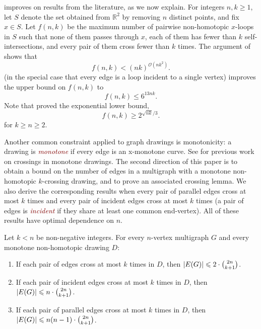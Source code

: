 \documentclass[a4paper,11pt]{article}
\renewcommand{\geq}{\geqslant}
\renewcommand{\leq}{\leqslant}
\DeclarePairedDelimiter{\abs}{\lvert}{\rvert} %
\newcommand{\defn}[1]{\textcolor{Maroon}{\emph{#1}}}
\newcommand{\OO}{\mathcal{O}}
\begin{document}
 improves on results from the literature, as we now explain. 
For integers $n, k \geq 1$, let $S$ denote the set obtained from $\mathbb{R}^2$ by removing $n$
distinct points, and fix $x\in S$. Let $f(n, k)$ be the maximum number of pairwise non-homotopic $x$-loops in $S$ such that none of them passes through $x$, each of them has fewer than $k$ self-intersections, and every pair of them cross fewer than $k$ times. 
The argument of \citet*{JMM96} shows that
\begin{equation}\label{eq:fUpperBound} 
   f(n, k) < (nk)^{\OO(nk^2)}.
\end{equation}
 (in the special case that every edge is a loop incident to a single vertex) improves the upper bound on $f(n, k)$ to
\begin{equation*}
    f(n, k) \leq 6^{13 n k}. 
\end{equation*}
Note that \citet*{PTT22} proved the exponential lower bound, 
\begin{equation}\label{eq:PTTLB}
    f(n, k) \geq 2^{\sqrt{nk}/3}.
\end{equation}
for $k \geq n \geq 2$.

Another common constraint applied to graph drawings is monotonicity: a drawing is \defn{monotone} if every edge is an x-monotone curve. See \citep{PT12,FPT10,PT04,PS11,FIKKMS16} for previous work on crossings in monotone drawings. The second direction of this paper is to obtain a bound on the number of edges in a multigraph with a monotone non-homotopic $k$-crossing drawing, and to prove an associated crossing lemma. We also derive the corresponding results when every pair of parallel edges cross at most $k$ times and every pair of incident edges cross at most $k$ times (a pair of edges is \defn{incident} if they share at least one common end-vertex). All of these results have optimal dependence on $n$.

\begin{theorem}\label{MonotoneNonHomotopic}
    Let $k < n$ be non-negative integers. For every $n$-vertex multigraph $G$ and every monotone non-homotopic drawing $D$\textup{:}
    \begin{enumerate}[label = \textup{(}\alph{*}\textup{)}]
        \item If each pair of edges cross at most $k$ times in $D$, then $\abs{E(G)} \leq 2 \cdot \binom{2 n}{k + 1}$. \label{edge:all}
        \item If each pair of incident edges cross at most $k$ times in $D$, then $\abs{E(G)} \leq n \cdot \binom{2 n}{k + 1}$. \label{edge:incident}
        \item If each pair of parallel edges cross at most $k$ times in $D$, then $\abs{E(G)} \leq n(n - 1) \cdot \binom{2 n}{k + 1}$. \label{edge:parallel}
    \end{enumerate}
\end{theorem}
\end{document}
